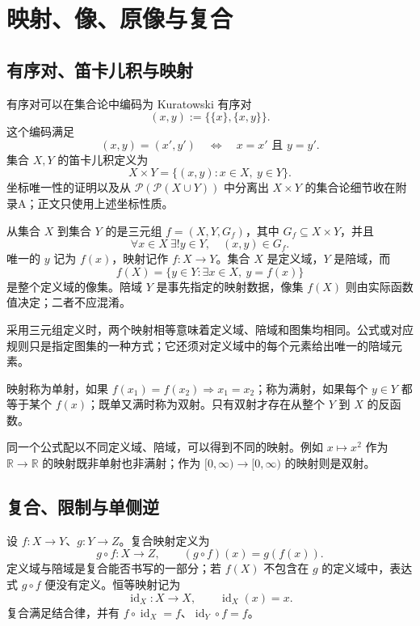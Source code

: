 \section{映射、像、原像与复合}


\subsection{有序对、笛卡儿积与映射}

有序对可以在集合论中编码为 Kuratowski 有序对
\[
  (x,y):=\bigl\{\{x\},\{x,y\}\bigr\}.
\]
这个编码满足
\[
  (x,y)=(x',y')\quad\Longleftrightarrow\quad x=x'\text{ 且 }y=y'.
\]
集合 \(X,Y\) 的笛卡儿积定义为
\[
  X\times Y=\{(x,y):x\in X,\ y\in Y\}.
\]
坐标唯一性的证明以及从 \(\mathcal P(\mathcal P(X\cup Y))\) 中分离出 \(X\times Y\) 的集合论细节收在附录A；正文只使用上述坐标性质。

从集合 \(X\) 到集合 \(Y\) 的是三元组 \(f=(X,Y,G_f)\)，其中 \(G_f\subseteq X\times Y\)，并且
\[
  \forall x\in X\ \exists!y\in Y,\quad (x,y)\in G_f.
\]
唯一的 \(y\) 记为 \(f(x)\)，映射记作 \(f:X\to Y\)。集合 \(X\) 是定义域，\(Y\) 是陪域，而
\[
  f(X)=\{y\in Y:\exists x\in X,\ y=f(x)\}
\]
是整个定义域的像集。陪域 \(Y\) 是事先指定的映射数据，像集 \(f(X)\) 则由实际函数值决定；二者不应混淆。

采用三元组定义时，两个映射相等意味着定义域、陪域和图集均相同。公式或对应规则只是指定图集的一种方式；它还须对定义域中的每个元素给出唯一的陪域元素。

映射称为单射，如果 \(f(x_1)=f(x_2)\Rightarrow x_1=x_2\)；称为满射，如果每个 \(y\in Y\) 都等于某个 \(f(x)\)；既单又满时称为双射。只有双射才存在从整个 \(Y\) 到 \(X\) 的反函数。

同一个公式配以不同定义域、陪域，可以得到不同的映射。例如 \(x\mapsto x^2\) 作为 \(\mathbb R\to\mathbb R\) 的映射既非单射也非满射；作为 \([0,\infty)\to[0,\infty)\) 的映射则是双射。

\subsection{复合、限制与单侧逆}

设 \(f:X\to Y\)、\(g:Y\to Z\)。复合映射定义为
\[
  g\circ f:X\to Z,\qquad (g\circ f)(x)=g(f(x)).
\]
定义域与陪域是复合能否书写的一部分；若 \(f(X)\) 不包含在 \(g\) 的定义域中，表达式 \(g\circ f\) 便没有定义。恒等映射记为
\[
  \operatorname{id}_X:X\to X,\qquad \operatorname{id}_X(x)=x.
\]
复合满足结合律，并有 \(f\circ\operatorname{id}_X=f\)、\(\operatorname{id}_Y\circ f=f\)。

